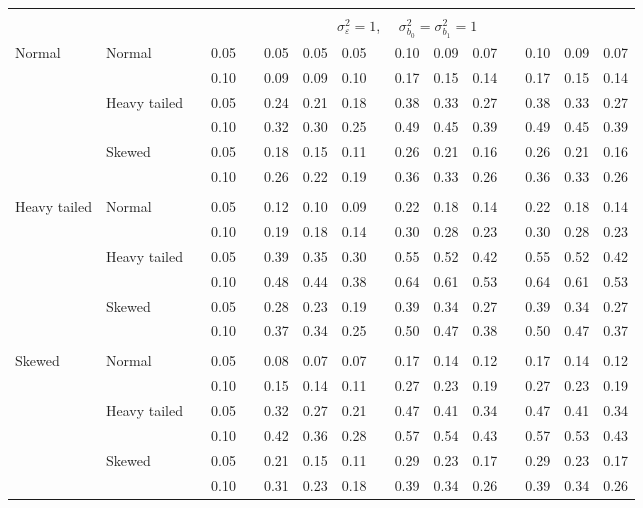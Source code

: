 \documentclass{article} %
\begin{document}
\begin{table}[ht]
\begin{scriptsize}
\begin{center}
\begin{tabular}{ll p{.1cm} c p{.1cm} rrr p{.1cm} rrr p{.1cm} rrr}
&&&&&&&&&&&&&&&\\
& && && \multicolumn{9}{c}{$\sigma_{\varepsilon}^2 = 1$, \ \ $\sigma_{b_0}^2 = \sigma_{b_1}^2 = 1$} \\ \cline{6-16}
Normal       & Normal       && 0.05 &&  0.05 & 0.05 & 0.05 && 0.10 & 0.09 & 0.07 && 0.10 & 0.09 & 0.07 \\ 
             &              && 0.10 &&  0.09 & 0.09 & 0.10 && 0.17 & 0.15 & 0.14 && 0.17 & 0.15 & 0.14 \\ 
             & Heavy tailed && 0.05 &&  0.24 & 0.21 & 0.18 && 0.38 & 0.33 & 0.27 && 0.38 & 0.33 & 0.27 \\ 
             &              && 0.10 &&  0.32 & 0.30 & 0.25 && 0.49 & 0.45 & 0.39 && 0.49 & 0.45 & 0.39 \\ 
             & Skewed       && 0.05 &&  0.18 & 0.15 & 0.11 && 0.26 & 0.21 & 0.16 && 0.26 & 0.21 & 0.16 \\ 
             &              && 0.10 &&  0.26 & 0.22 & 0.19 && 0.36 & 0.33 & 0.26 && 0.36 & 0.33 & 0.26 \\ 
             &&&&&&&&&&&&&&&\\
Heavy tailed & Normal       && 0.05 &&  0.12 & 0.10 & 0.09 && 0.22 & 0.18 & 0.14 && 0.22 & 0.18 & 0.14 \\ 
             &              && 0.10 &&  0.19 & 0.18 & 0.14 && 0.30 & 0.28 & 0.23 && 0.30 & 0.28 & 0.23 \\ 
             & Heavy tailed && 0.05 &&  0.39 & 0.35 & 0.30 && 0.55 & 0.52 & 0.42 && 0.55 & 0.52 & 0.42 \\ 
             &              && 0.10 &&  0.48 & 0.44 & 0.38 && 0.64 & 0.61 & 0.53 && 0.64 & 0.61 & 0.53 \\ 
             & Skewed       && 0.05 &&  0.28 & 0.23 & 0.19 && 0.39 & 0.34 & 0.27 && 0.39 & 0.34 & 0.27 \\ 
             &              && 0.10 &&  0.37 & 0.34 & 0.25 && 0.50 & 0.47 & 0.38 && 0.50 & 0.47 & 0.37 \\ 
             &&&&&&&&&&&&&&&\\
Skewed       & Normal       && 0.05 &&  0.08 & 0.07 & 0.07 && 0.17 & 0.14 & 0.12 && 0.17 & 0.14 & 0.12 \\ 
             &              && 0.10 &&  0.15 & 0.14 & 0.11 && 0.27 & 0.23 & 0.19 && 0.27 & 0.23 & 0.19 \\ 
             & Heavy tailed && 0.05 &&  0.32 & 0.27 & 0.21 && 0.47 & 0.41 & 0.34 && 0.47 & 0.41 & 0.34 \\ 
             &              && 0.10 &&  0.42 & 0.36 & 0.28 && 0.57 & 0.54 & 0.43 && 0.57 & 0.53 & 0.43 \\ 
             & Skewed       && 0.05 &&  0.21 & 0.15 & 0.11 && 0.29 & 0.23 & 0.17 && 0.29 & 0.23 & 0.17 \\ 
             &              && 0.10 &&  0.31 & 0.23 & 0.18 && 0.39 & 0.34 & 0.26 && 0.39 & 0.34 & 0.26 \\ 
 


\end{tabular}
\end{center}
\end{scriptsize}
\end{table}
\end{document}

